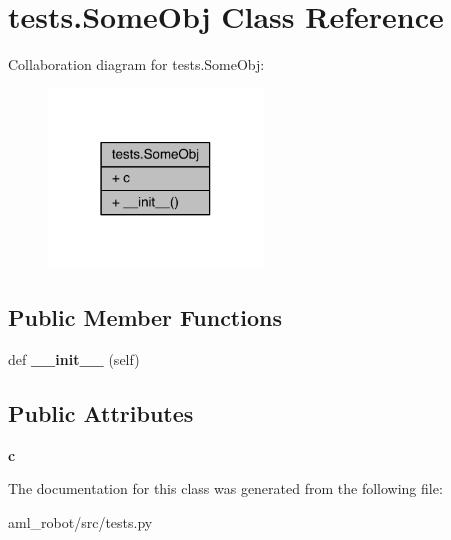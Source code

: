 \hypertarget{classtests_1_1_some_obj}{}\section{tests.\+Some\+Obj Class Reference}
\label{classtests_1_1_some_obj}


Collaboration diagram for tests.\+Some\+Obj\+:
\nopagebreak
\begin{figure}[H]
\begin{center}
\leavevmode
\includegraphics[width=162pt]{classtests_1_1_some_obj__coll__graph}
\end{center}
\end{figure}
\subsection*{Public Member Functions}
\begin{DoxyCompactItemize}
\item 
\hypertarget{classtests_1_1_some_obj_a6bbab9d4ef4c83ef011a468be214639d}{}\label{classtests_1_1_some_obj_a6bbab9d4ef4c83ef011a468be214639d} 
def {\bfseries \+\_\+\+\_\+init\+\_\+\+\_\+} (self)
\end{DoxyCompactItemize}
\subsection*{Public Attributes}
\begin{DoxyCompactItemize}
\item 
\hypertarget{classtests_1_1_some_obj_ad442c35720f3dd0172c277d3bb4e9316}{}\label{classtests_1_1_some_obj_ad442c35720f3dd0172c277d3bb4e9316} 
{\bfseries c}
\end{DoxyCompactItemize}


The documentation for this class was generated from the following file\+:\begin{DoxyCompactItemize}
\item 
aml\+\_\+robot/src/tests.\+py\end{DoxyCompactItemize}
